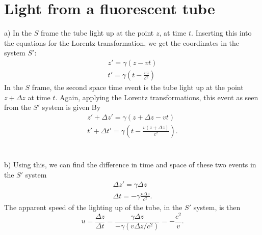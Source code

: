 \documentclass{article}
\begin{document}
    \section{Light from a fluorescent tube}
        a) In the $S$ frame the tube light up at the point $z$, at time $t$. Inserting this into the equations for the Lorentz transformation, we get the coordinates in the system $S'$:
        \begin{align*}
            z' = \gamma(z - v t) \\
            t' = \gamma\left(t - \frac{vz}{c^2}\right)
        \end{align*}
        In the $S$ frame, the second space time event is  the tube light up at the point $z + \Delta z$ at time $t$. Again, applying the Lorentz transformations, this event as seen from the $S'$ system is given By
        \begin{align*}
            z' + \Delta z' = \gamma (z + \Delta z - vt) \\
            t' + \Delta t' = \gamma \left(t - \frac{v(z + \Delta z)}{c^2}\right).
        \end{align*} \\ \\
        b) Using this, we can find the difference in time and space of these two events in the $S'$ system
        \begin{align*}
            \Delta z' = \gamma \Delta z \\
            \Delta t = -\gamma \frac{v \Delta z}{c^2}.
        \end{align*}
        The apparent speed of the lighting up of the tube, in the $S'$ system, is then
        \begin{equation*}
            u = \frac{\Delta z}{\Delta t} = \frac{\gamma \Delta z}{-\gamma (v \Delta z/c^2)} = -\frac{c^2}{v}.
        \end{equation*}
\end{document}
